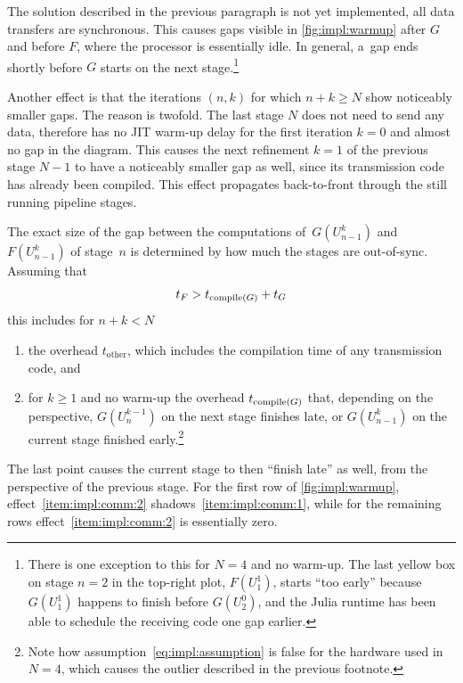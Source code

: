 The solution described in the previous paragraph is not yet implemented,
\ie all data transfers are synchronous.
This causes gaps visible in \autoref{fig:impl:warmup} after $G$ and before $F$,
where the processor is essentially idle.
In general, a~gap ends shortly before $G$ starts on the next stage.\footnote{%
  There is one exception to this for $N=4$ and no warm-up.
  The last yellow box on stage $n=2$ in the top-right plot, $F(U_1^1)$,
  starts \enquote{too early} because $G(U_1^1)$ happens to finish before $G(U_2^0)$,
  and the Julia runtime has been able to schedule the receiving code one gap earlier.
}

Another effect is that the iterations $(n,k)$ for which $n+k \geq N$ show noticeably smaller gaps.
The reason is twofold.
The last stage $N$ does not need to send any data,
therefore has no \ac{JIT} warm-up delay for the first iteration $k=0$ and almost no gap in the diagram.
This causes the next refinement $k=1$ of the previous stage $N-1$ to have a noticeably smaller gap as well,
since its transmission code has already been compiled.
This effect propagates back-to-front through the still running pipeline stages.

The exact size of the gap between the computations of~$G(U_{n-1}^k)$ and~$F(U_{n-1}^k)$ of stage~$n$ is determined by
how much the stages are out-of-sync.
Assuming that
\begin{equation}
\label{eq:impl:assumption}
  t_F > t_{\operatorname{compile}(G)} + t_G
\end{equation}
this includes for $n+k < N$
\begin{enumerate}
  \item\label{item:impl:comm:1}
    the overhead $t_\text{other}$,
    which includes \eg the compilation time of any transmission code,
    and
  \item\label{item:impl:comm:2}
    for $k\geq 1$ and no warm-up
    the overhead $t_{\operatorname{compile}(G)}$ that,
    depending on the perspective,
    $G(U_n^{k-1})$ on the next stage finishes late,
    or $G(U_{n-1}^k)$ on the current stage finished early.\footnote{%
      Note how assumption~\eqref{eq:impl:assumption} is false for the hardware used in $N=4$,
      which causes the outlier described in the previous footnote.
    }
\end{enumerate}
The last point causes the current stage to then \enquote{finish late} as well,
from the perspective of the previous stage.
For the first row of \autoref{fig:impl:warmup},
effect~\ref{item:impl:comm:2} shadows~\ref{item:impl:comm:1},
while for the remaining rows effect~\ref{item:impl:comm:2} is essentially zero.

